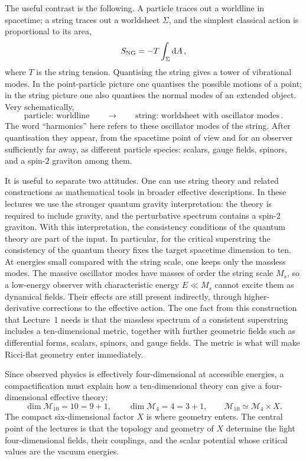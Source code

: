 The useful contrast is the following. A particle
traces out a worldline in spacetime; a string traces out a worldsheet
$\Sigma$, and the simplest classical action is proportional to its
area,
\begin{equation}
    S_{\rm NG}=-T\int_{\Sigma}\mathrm{d}A \, ,
\end{equation}
where $T$ is the string tension. Quantising the string gives a
tower of vibrational modes. 
In the point-particle picture
one quantises the possible motions of a point; in the string picture
one also quantises the normal modes of an extended object.  Very
schematically,
\begin{equation}
    \text{particle: worldline}
    \qquad\longrightarrow\qquad
    \text{string: worldsheet with oscillator modes}\, .
\end{equation}
The word ``harmonics'' here refers to these oscillator modes of the
string.  After quantisation they appear, from the spacetime point of
view and for an observer sufficiently far away, as different particle
species: scalars, gauge fields, spinors, and a spin-$2$ graviton
among them.


It is useful to separate two attitudes.  One can use
string theory and related constructions as mathematical
tools in broader effective descriptions.  In these lectures we use
the stronger quantum gravity interpretation: the theory is required
to include gravity, and the perturbative spectrum contains a
spin-$2$ graviton.  With this interpretation, the consistency
conditions of the quantum theory are part of the input.  In
particular, for the critical superstring the consistency of the quantum theory fixes the target spacetime dimension to ten.
At energies small compared with the
string scale, one keeps only the massless modes. 
The massive oscillator modes have masses of order the string
scale $M_s$, so a low-energy observer with characteristic energy
$E\ll M_s$ cannot excite them as dynamical fields.  Their effects are
still present indirectly, through higher-derivative corrections to
the effective action.
The one fact from
this construction that Lecture~1 needs is that the massless spectrum
of a consistent superstring includes a ten-dimensional metric,
together with further geometric fields such as differential forms,
scalars, spinors, and gauge fields. The metric is what will make
Ricci-flat geometry enter immediately.

Since observed physics is effectively
four-dimensional at accessible energies, a compactification must
explain how a ten-dimensional theory can give a four-dimensional
effective theory:
\begin{equation}
    \dim \mathcal{M}_{10}=10=9+1,
    \qquad
    \dim \mathcal{M}_4=4=3+1,
    \qquad
    \mathcal{M}_{10}\simeq \mathcal{M}_4\times X .
\end{equation}
The compact six-dimensional factor $X$ is where geometry enters.
The central point of the lectures is that the topology and geometry
of $X$ determine the light four-dimensional fields, their
couplings, and the scalar potential whose critical values are the
vacuum energies.




